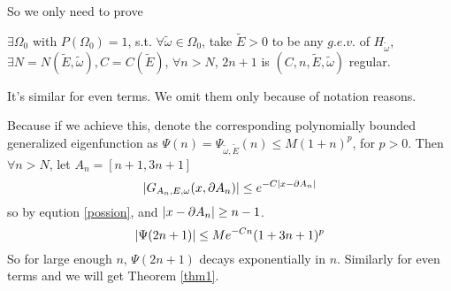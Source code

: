 So we only need to prove
\begin{thm}\label{thm2}
  $\exists \Omega_0$ with $P(\Omega_0)=1$, s.t. $\forall \tilde{\omega}\in\Omega_0$, take $\tilde{E}>0$ to be any $g.e.v.$ of $H_{\tilde{\omega}}$, $\exists N=N(\tilde{E},\tilde{\omega}),C=C(\tilde{E})$, $\forall n>N$, $2n+1$ is $(C,n,\tilde{E},\tilde{\omega})$ regular.
\end{thm}
\begin{remark}
  It's similar for even terms. We omit them only because of notation reasons.
\end{remark}
\begin{remark}
  Because if we achieve this, denote the corresponding polynomially bounded generalized eigenfunction as $\Psi(n)=\Psi_{\tilde{\omega},\tilde{E}}(n)\leq M(1+n)^p$, for $p>0$. Then $\forall n>N$, let $A_n=[n+1,3n+1]$
  \[
  \left\vert G_{A_n,E,\omega}(x,\partial A_n)\right\vert \leq e^{-C\lvert x-\partial A_n\rvert}
  \]
  so by eqution \ref{possion}, and $\lvert x-\partial A_n\rvert\geq n-1$.
  \[
  \lvert\Psi(2n+1)\rvert\leq Me^{-Cn}(1+3n+1)^p
  \]
  So for large enough $n$, $\Psi(2n+1)$ decays exponentially in $n$. Similarly for even terms and we will get Theorem \ref{thm1}.
\end{remark}

